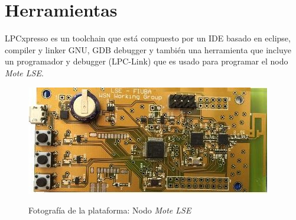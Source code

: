 \section{Herramientas}
\label{sec:herramientas}

LPCxpresso es un toolchain que está compuesto por un IDE basado en eclipse, compiler y linker GNU, GDB debugger y también una herramienta que incluye un programador y debugger (LPC-Link) que es usado para programar el nodo \textit{Mote LSE}.

\vspace{10px}

\begin{figure}[h!]
	\centering
    \includegraphics[width=.8\textwidth]{./Figures/mote.jpg}
	\label{fig:mote}
	\caption{Fotografía de la plataforma: Nodo \textit{Mote LSE}}
\end{figure}

